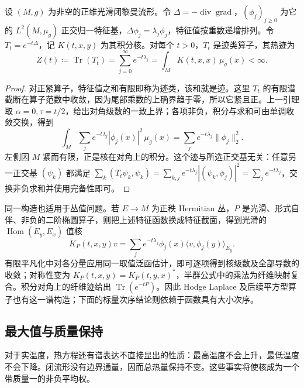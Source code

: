 \begin{proposition}\label{g3:prop:heat-kernel-trace}
	设 \((M,g)\) 为非空的正维光滑闭黎曼流形。令 \(\Delta=-\operatorname{div}\operatorname{grad}\)，\((\phi_j)_{j\ge0}\) 为它的 \(L^2(M,\mu_g)\) 正交归一特征基，\(\Delta\phi_j=\lambda_j\phi_j\)，特征值按重数递增排列。令 \(T_t=e^{-t\Delta}\)，记 \(K(t,x,y)\) 为其积分核。对每个 \(t>0\)，\(T_t\) 是迹类算子，其热迹为
	\begin{equation}\label{g3:eq:heat-kernel-trace}
		Z(t)\coloneqq\operatorname{Tr}(T_t)
		=\sum_{j=0}^\infty e^{-t\lambda_j}
		=\int_M K(t,x,x)\,\mu_g(x)<\infty.
	\end{equation}
\end{proposition}
\begin{proof}
	对正紧算子，特征值之和有限即称为迹类，该和就是迹。这里 \(T_t\) 的有限谱截断在算子范数中收敛，因为尾部乘数的上确界趋于零，所以它紧且正。上一引理取 \(\alpha=0,\tau=t/2\)，给出对角级数的一致上界；各项非负，积分与求和可由单调收敛交换，得到
	\[
		\int_M\sum_j e^{-t\lambda_j}|\phi_j(x)|^2\,\mu_g(x)
		=\sum_j e^{-t\lambda_j}\|\phi_j\|_2^2.
	\]
	左侧因 \(M\) 紧而有限，正是核在对角上的积分。这个迹与所选正交基无关：任意另一正交基 \((\psi_k)\) 都满足
	\(\sum_k(T_t\psi_k,\psi_k)=\sum_{k,j}e^{-t\lambda_j}|(\psi_k,\phi_j)|^2=\sum_j e^{-t\lambda_j}\)，交换非负求和并使用完备性即可。
\end{proof}

同一构造也适用于丛值问题。若 \(E\to M\) 为正秩 Hermitian 丛，\(P\) 是光滑、形式自伴、非负的二阶椭圆算子，则把上述特征函数换成特征截面，得到光滑的 \(\operatorname{Hom}(E_y,E_x)\) 值核
\begin{equation}\label{g3:eq:bundle-heat-kernel}
	K_P(t,x,y)v=\sum_j e^{-t\lambda_j}\phi_j(x)
	\langle v,\phi_j(y)\rangle_{E_y}.
\end{equation}
有限平凡化中对各分量应用同一取值泛函估计，即可逐项得到核级数及全部导数的收敛；对称性变为 \(K_P(t,x,y)=K_P(t,y,x)^*\)，半群公式中的乘法为纤维映射复合。积分对角上的纤维迹给出 \(\operatorname{Tr}(e^{-tP})\)。因此 Hodge Laplace 及后续平方型算子也有这一谱构造；下面的标量次序结论则依赖于函数具有大小次序。

\subsection{最大值与质量保持}
\label{g3:subsec:1601:04}

对于实温度，热方程还有谱表达不直接显出的性质：最高温度不会上升，最低温度不会下降。闭流形没有边界通量，因而总热量保持不变。这些事实将使核成为一个带质量一的非负平均权。

